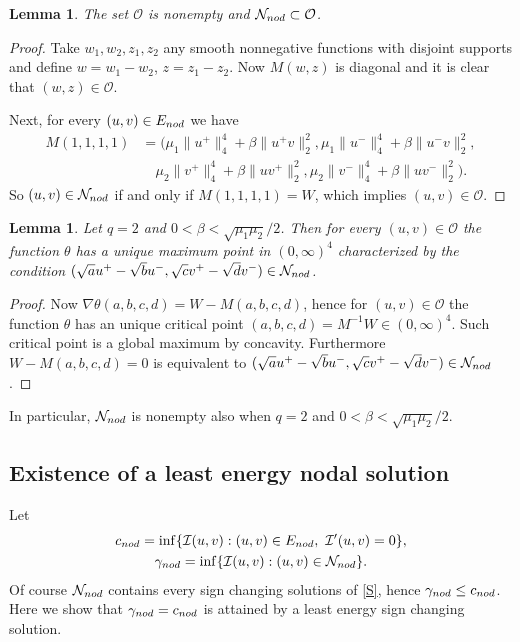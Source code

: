 \documentclass[10pt,a4paper]{amsart}
\numberwithin{equation}{section}
\newtheorem{lemma}[theo]{Lemma}
\begin{document}
\begin{lemma}\label{lem:O}
 The set $\mathcal O$ is nonempty and $\mathcal N_{\rm nod}\subset \mathcal O$.
\end{lemma}

\begin{proof}
Take $w_1, w_2, z_1, z_2$ any smooth nonnegative functions with disjoint supports
and define $w=w_1-w_2$, $z=z_1-z_2$.
Now $M(w,z)$ is diagonal and it is clear that $(w,z)\in \mathcal O$.

Next,  for every $(u,v)\in E_{\rm nod}$ we have
\begin{align*}
M (1,1,1,1)
&= \Big(\mu_1\|u^+\|_{4}^{4} + \beta \|u^+v\|_2^2 ,
 \mu_1\|u^-\|_{4}^{4} + \beta \|u^-v\|_2^2 , \\
&\quad \mu_2 \|v^+\|_{4}^{4} +\beta \|uv^+\|_2^2 ,
\mu_2\|v^-\|_{4}^{4} +\beta \|uv^-\|_2^2 \Big) .
\end{align*}
So $(u,v)\in \mathcal N_{\rm nod}$ if and only if  $M(1,1,1,1)=W$, which implies
$(u,v)\in \mathcal O$.
\end{proof}

\begin{lemma}\label{prop:theta_q2}
Let $q=2$ and $0<\beta<\sqrt{\mu_1\mu_2}/2$.
Then for every $(u,v)\in  \mathcal O$  the function
$\theta$ has a unique maximum point in $ (0,\infty)^4$ characterized by the
condition $(\sqrt{a} u^+ -\sqrt{b} u^-, \sqrt{c} v^+ -\sqrt{d} v^-)
\in \mathcal N_{\rm nod}$.
\end{lemma}

\begin{proof}
Now $\nabla\theta(a,b,c,d)= W- M(a,b,c,d)$, hence for $(u,v)\in \mathcal O$ the
function $\theta $ has an unique critical point  $(a,b,c,d)= M^{-1} W \in (0,\infty)^4$.
Such critical point is a global maximum by concavity.
Furthermore $W-M(a,b,c,d)=0$ is equivalent to
$(\sqrt{a} u^+ -\sqrt{b} u^-, \sqrt{c} v^+ -\sqrt{d} v^-) \in \mathcal N_{\rm nod}$.
\end{proof}

In particular, $\mathcal N_{\rm nod}$ is nonempty also when $q=2$ and
$0<\beta<\sqrt{\mu_1\mu_2}/2$.

\subsection{Existence of a least energy nodal solution}\label{sub:existence_lesc}
Let
\begin{gather}
c_{\rm nod} =\inf \{ \mathcal I(u,v) : (u,v)\in E_{\rm nod} , \  \mathcal I'(u,v)=0\}, \\
\gamma_{\rm nod} =\inf \{ \mathcal I(u,v) : (u,v)\in \mathcal N_{\rm nod} \}.
\end{gather}
Of course $\mathcal N_{\rm nod}$ contains every sign changing solutions of \eqref{S},
hence $\gamma_{\rm nod} \le c_{\rm nod}$. Here we show that
$\gamma_{\rm nod}=c_{\rm nod}$ is attained by a least energy sign changing solution.
\end{document}
